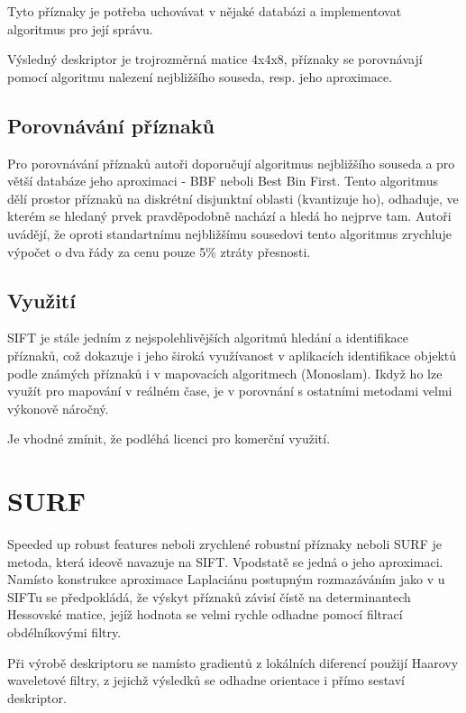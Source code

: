 	Tyto příznaky je potřeba uchovávat v nějaké databázi a implementovat algoritmus
	pro její správu.
	
	Výsledný deskriptor je trojrozměrná matice 4x4x8, příznaky se porovnávají pomocí algoritmu nalezení nejbližšího souseda, resp. jeho aproximace.
	
	\subsection{Porovnávání příznaků}
	
	Pro porovnávání příznaků autoři doporučují algoritmus nejbližšího souseda a pro větší databáze jeho aproximaci - BBF neboli Best Bin First. Tento algoritmus dělí prostor příznaků na diskrétní disjunktní oblasti (kvantizuje ho), odhaduje, ve kterém se hledaný prvek pravděpodobně nachází a hledá ho nejprve tam. Autoři uvádějí, že oproti standartnímu nejbližšímu sousedovi tento algoritmus zrychluje výpočet o dva řády za cenu pouze 5\% ztráty přesnosti.
	
	\subsection{Využití}
	
	SIFT je stále jedním z nejspolehlivějších algoritmů hledání a identifikace příznaků, což dokazuje i jeho široká využívanost v aplikacích identifikace objektů podle známých příznaků i v mapovacích algoritmech (Monoslam). Ikdyž ho lze využít pro mapování v reálném čase, je v porovnání s ostatními metodami velmi výkonově náročný.
	
	Je vhodné zmínit, že podléhá licenci pro komerční využití.

\section{SURF}

	Speeded up robust features neboli zrychlené robustní příznaky neboli SURF je metoda, která ideově navazuje na SIFT. Vpodstatě se jedná o jeho aproximaci. Namísto konstrukce aproximace Laplaciánu postupným rozmazáváním jako v u SIFTu se předpokládá, že výskyt příznaků závisí čístě na determinantech Hessovské matice, jejíž hodnota se velmi rychle odhadne pomocí filtrací obdélníkovými filtry.
	
	Při výrobě deskriptoru se namísto gradientů z lokálních diferencí použijí Haarovy waveletové filtry, z jejichž výsledků se odhadne orientace i přímo sestaví deskriptor. 
	
